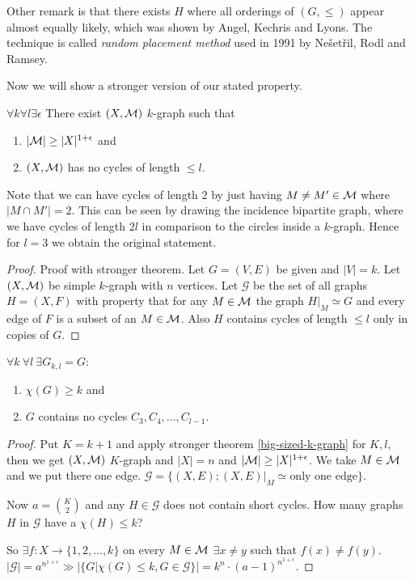Other remark is that there exists $H$ where all orderings of $(G, \leq)$ appear almost equally likely, which was shown by Angel, Kechris and Lyons. The technique is called \textit{random placement method} used in 1991 by Nešetřil, Rodl and Ramsey.

Now we will show a stronger version of our stated property.

\begin{thm}
	$\forall k \forall l \exists \epsilon$ There exist $(X, \mathcal{M})$ $k$-graph such that
	
	\begin{enumerate}
		\item $|\mathcal{M}| \geq |X|^{1 + \epsilon}$ and
		\item $(X, \mathcal{M})$ has no cycles of length $\leq l$.
	\end{enumerate}
	\label{big-sized-k-graph}
\end{thm}

Note that we can have cycles of length $2$ by just having $M \neq M' \in \mathcal{M}$ where $|M \cap M'| = 2$. This can be seen by drawing the incidence bipartite graph, where we have cycles of length $2l$ in comparison to the circles inside a $k$-graph. Hence for $l = 3$ we obtain the original statement.

\begin{proof}{Proof with stronger theorem.}
	Let $G = (V,E)$ be given and $|V| = k$. Let $(X, \mathcal{M})$ be simple $k$-graph with $n$ vertices. Let $\mathcal{G}$ be the set of all graphs $H = (X,F)$ with property that for any $M \in \mathcal{M}$ the graph $H|_M \simeq G$ and every edge of $F$ is a subset of an $M \in \mathcal{M}$. Also $H$ contains cycles of length $\leq l$ only in copies of $G$.
\end{proof}

\begin{thm}
	$\forall k \ \forall l \ \exists G_{k,l} = G$:

	\begin{enumerate}
		\item $\chi(G) \geq k$ and
		\item $G$ contains no cycles $C_3, C_4, \dots, C_{l-1}$.
	\end{enumerate}
\end{thm}

\begin{proof}
	Put $K = k+1$ and apply stronger theorem \ref{big-sized-k-graph} for $K,l$, then we get $(X, \mathcal{M})$ $K$-graph and $|X| = n$ and $|\mathcal{M}| \geq |X|^{1 + \epsilon}$. We take $M \in \mathcal{M}$ and we put there one edge. $\mathcal{G} = \{(X,E); (X,E)|_M \simeq \text{only one edge}\}$.
	
	Now $a = \binom{K}{2}$ and any $H \in \mathcal{G}$ does not contain short cycles. How many graphs $H$ in $\mathcal{G}$ have a $\chi(H) \leq k$?
	
	So $\exists f: X \to \{1, 2, \dots, k\}$ on every $M \in \mathcal{M}$ $\exists x \neq y$ such that $f(x) \neq f(y)$. $|\mathcal{G}| = a^{n^{1+\epsilon}} \gg |\{G | \chi(G) \leq k, G \in \mathcal{G}\}| = k^n \cdot (a-1)^{n^{1 + \epsilon}}$.
\end{proof}

